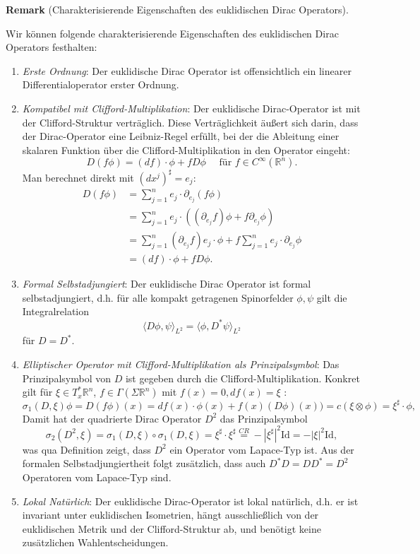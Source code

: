 \documentclass[10pt, letterpaper]{article}
\newcommand{\R}{\mathbb{R}}
\newcommand{\CustomHeading}[3]{%
  \par\medskip\noindent%
  \textbf{#1 #2} \textnormal{(#3)}.\enskip%
}
\newenvironment{REM}[2]{\CustomHeading{Remark}{#1}{#2}}{}
\begin{document}
\begin{REM}{}{Charakterisierende Eigenschaften des euklidischen Dirac Operators}
  Wir können folgende charakterisierende Eigenschaften des euklidischen Dirac Operators festhalten:
  \begin{enumerate}
    \item \emph{Erste Ordnung}: Der euklidische Dirac Operator ist offensichtlich ein linearer Differentialoperator erster Ordnung.
    
    \item \emph{Kompatibel mit Clifford-Multiplikation}: 
    Der euklidische Dirac-Operator ist mit der Clifford-Struktur verträglich. Diese Verträglichkeit äußert sich darin, dass der Dirac-Operator eine Leibniz-Regel erfüllt, bei der die Ableitung einer skalaren Funktion über die Clifford-Multiplikation in den Operator eingeht:
    $$
    D(f \phi)=(df) \cdot \phi+f D \phi \quad \text { für } f \in C^{\infty}\left(\mathbb{R}^n\right) .
    $$
    Man berechnet direkt mit $(dx^j)^\sharp=e_j$:
    $$\begin{aligned} D(f \phi) & =\sum_{j=1}^n e_j \cdot \partial_{e_j}(f \phi) \\ & =\sum_{j=1}^n e_j \cdot\left(\left(\partial_{e_j} f\right) \phi+f \partial_{e_j} \phi\right) \\ & =\sum_{j=1}^n\left(\partial_{e_j} f\right) e_j \cdot \phi+f \sum_{j=1}^n e_j \cdot \partial_{e_j} \phi \\ & = (d f)\cdot \phi+f D \phi.\end{aligned}$$

    \item \emph{Formal Selbstadjungiert}: Der euklidische Dirac Operator ist formal selbstadjungiert, d.h. für alle kompakt getragenen Spinorfelder $\phi, \psi$ gilt die Integralrelation
    $$
    \langle D \phi, \psi\rangle_{L^2}=\langle\phi, D^*\psi\rangle_{L^2}
    $$
    für $D=D^*$. 

    \item \emph{Elliptischer Operator mit Clifford-Multiplikation als Prinzipalsymbol}: Das Prinzipalsymbol von $D$ ist gegeben durch die Clifford-Multiplikation.
    Konkret gilt für $\xi \in T_x^* \mathbb{R}^n$, $f\in \Gamma(\Sigma \R^n)$ mit $f(x)=0,df(x)=\xi$ :
    $$
    \sigma_1(D, \xi)\phi= D (f\phi)(x)= df(x) \cdot \phi(x)+ f(x)(D\phi)(x))= c(\xi\otimes\phi)=\xi^\sharp\cdot \phi,
    $$
    Damit hat der quadrierte Dirac Operator $D^2$ das Prinzipalsymbol
    $$
    \sigma_2(D^2, \xi)=\sigma_1(D, \xi)\circ \sigma_1(D, \xi) = \xi^\sharp\cdot\xi^\sharp\overset{CR}{=} -|\xi^\sharp|^2 \mathrm{Id}=-|\xi|^2\mathrm{Id},
    $$
    was qua Definition zeigt, dass $D^2$ ein Operator vom Lapace-Typ ist. Aus der formalen Selbstadjungiertheit folgt zusätzlich, dass auch $D^*D=DD^*=D^2$ Operatoren vom Lapace-Typ sind.

    \item \emph{Lokal Natürlich}: Der euklidische Dirac-Operator ist lokal natürlich, d.h. er ist invariant unter euklidischen Isometrien, hängt ausschließlich von der euklidischen Metrik und der Clifford-Struktur ab, und benötigt keine zusätzlichen Wahlentscheidungen.
  \end{enumerate}
\end{REM}
\end{document}
